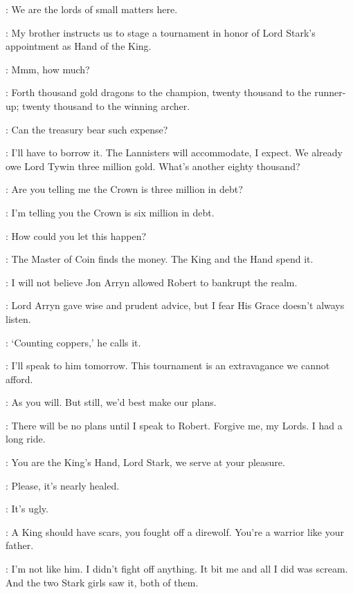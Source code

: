 \LITTLEFINGER: We are the lords of small matters here. 

\RENLY: My brother instructs us to stage a tournament in honor of Lord Stark's appointment as Hand of the King. 

\LITTLEFINGER: Mmm, how much? 

\NED: Forth thousand gold dragons to the champion, twenty thousand to the runner-up; twenty thousand to the winning archer. 

\PYCELLE: Can the treasury bear such expense? 

\LITTLEFINGER: I'll have to borrow it. The Lannisters will accommodate, I expect. We already owe Lord Tywin three million gold. What's another eighty thousand? 

\NED: Are you telling me the Crown is three million in debt? 

\LITTLEFINGER: I'm telling you the Crown is six million in debt. 

\NED: How could you let this happen? 

\LITTLEFINGER: The Master of Coin finds the money. The King and the Hand spend it. 

\NED: I will not believe Jon Arryn allowed Robert to bankrupt the realm. 

\PYCELLE: Lord Arryn gave wise and prudent advice, but I fear His Grace doesn't always listen. 

\RENLY: `Counting coppers,' he calls it. 

\NED: I'll speak to him tomorrow. This tournament is an extravagance we cannot afford. 

\LITTLEFINGER: As you will. But still, we'd best make our plans. 

\NED: There will be no plans until I speak to Robert. Forgive me, my Lords. I had a long ride. 

\VARYS: You are the King's Hand, Lord Stark, we serve at your pleasure. 

\scene



\CERSEI: Please, it's nearly healed. 

\JOFFREY: It's ugly. 

\CERSEI: A King should have scars, you fought off a direwolf. You're a warrior like your father. 

\JOFFREY: I'm not like him. I didn't fight off anything. It bit me and all I did was scream. And the two Stark girls saw it, both of them. 


